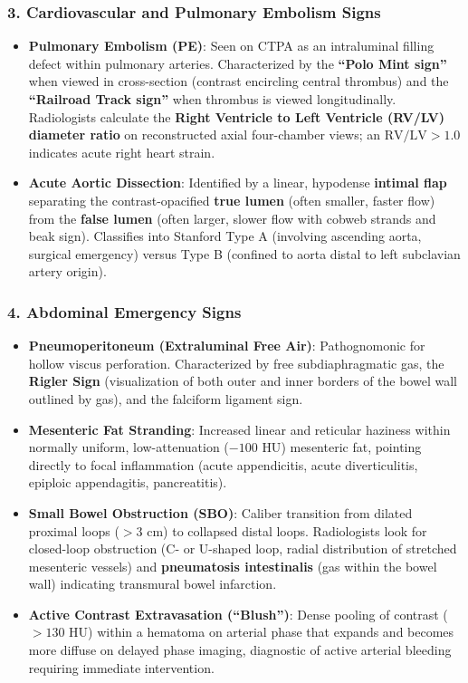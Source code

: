 \documentclass[11pt,a4paper]{article}
\begin{document}
\subsubsection{3. Cardiovascular and Pulmonary Embolism Signs}
\begin{itemize}
    \item \textbf{Pulmonary Embolism (PE)}: Seen on CTPA as an intraluminal filling defect within pulmonary arteries. Characterized by the \textbf{``Polo Mint sign''} when viewed in cross-section (contrast encircling central thrombus) and the \textbf{``Railroad Track sign''} when thrombus is viewed longitudinally. Radiologists calculate the \textbf{Right Ventricle to Left Ventricle (RV/LV) diameter ratio} on reconstructed axial four-chamber views; an $\text{RV/LV} > 1.0$ indicates acute right heart strain.
    \item \textbf{Acute Aortic Dissection}: Identified by a linear, hypodense \textbf{intimal flap} separating the contrast-opacified \textbf{true lumen} (often smaller, faster flow) from the \textbf{false lumen} (often larger, slower flow with cobweb strands and beak sign). Classifies into Stanford Type A (involving ascending aorta, surgical emergency) versus Type B (confined to aorta distal to left subclavian artery origin).
\end{itemize}

\subsubsection{4. Abdominal Emergency Signs}
\begin{itemize}
    \item \textbf{Pneumoperitoneum (Extraluminal Free Air)}: Pathognomonic for hollow viscus perforation. Characterized by free subdiaphragmatic gas, the \textbf{Rigler Sign} (visualization of both outer and inner borders of the bowel wall outlined by gas), and the falciform ligament sign.
    \item \textbf{Mesenteric Fat Stranding}: Increased linear and reticular haziness within normally uniform, low-attenuation ($-100\text{ HU}$) mesenteric fat, pointing directly to focal inflammation (acute appendicitis, acute diverticulitis, epiploic appendagitis, pancreatitis).
    \item \textbf{Small Bowel Obstruction (SBO)}: Caliber transition from dilated proximal loops ($>3\text{ cm}$) to collapsed distal loops. Radiologists look for closed-loop obstruction (C- or U-shaped loop, radial distribution of stretched mesenteric vessels) and \textbf{pneumatosis intestinalis} (gas within the bowel wall) indicating transmural bowel infarction.
    \item \textbf{Active Contrast Extravasation (``Blush'')}: Dense pooling of contrast ($>130\text{ HU}$) within a hematoma on arterial phase that expands and becomes more diffuse on delayed phase imaging, diagnostic of active arterial bleeding requiring immediate intervention.
\end{itemize}
\end{document}
